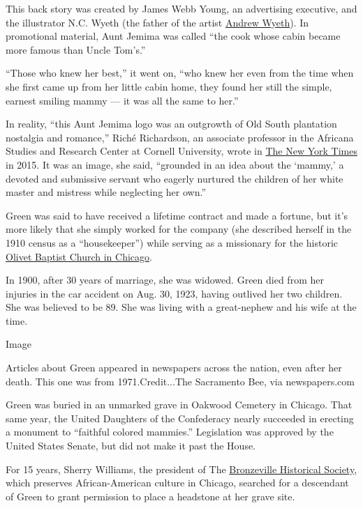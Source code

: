 This back story was created by James Webb Young, an advertising
executive, and the illustrator N.C. Wyeth (the father of the artist
\href{https://www.nytimes.com/2009/01/17/arts/design/17wyeth.html}{Andrew
Wyeth}). In promotional material, Aunt Jemima was called ``the cook
whose cabin became more famous than Uncle Tom's.''

``Those who knew her best,'' it went on, ``who knew her even from the
time when she first came up from her little cabin home, they found her
still the simple, earnest smiling mammy --- it was all the same to
her.''

In reality, ``this Aunt Jemima logo was an outgrowth of Old South
plantation nostalgia and romance,'' Riché Richardson, an associate
professor in the Africana Studies and Research Center at Cornell
University, wrote in
\href{https://www.nytimes.com/roomfordebate/2015/06/24/besides-the-confederate-flag-what-other-symbols-should-go/can-we-please-finally-get-rid-of-aunt-jemima}{The
New York Times} in 2015. It was an image, she said, ``grounded in an
idea about the `mammy,' a devoted and submissive servant who eagerly
nurtured the children of her white master and mistress while neglecting
her own.''

Green was said to have received a lifetime contract and made a fortune,
but it's more likely that she simply worked for the company (she
described herself in the 1910 census as a ``housekeeper'') while serving
as a missionary for the historic
\href{http://www.olivetbaptistchurchchicago.org/}{Olivet Baptist Church
in Chicago}.

In 1900, after 30 years of marriage, she was widowed. Green died from
her injuries in the car accident on Aug. 30, 1923, having outlived her
two children. She was believed to be 89. She was living with a
great-nephew and his wife at the time.

Image

Articles about Green appeared in newspapers across the nation, even
after her death. This one was from 1971.Credit...The Sacramento Bee, via
newspapers.com

Green was buried in an unmarked grave in Oakwood Cemetery in Chicago.
That same year, the United Daughters of the Confederacy nearly succeeded
in erecting a monument to ``faithful colored mammies.'' Legislation was
approved by the United States Senate, but did not make it past the
House.

For 15 years, Sherry Williams, the president of The
\href{https://bronzevillehistoricalsociety.wordpress.com/}{Bronzeville
Historical Society}, which preserves African-American culture in
Chicago, searched for a descendant of Green to grant permission to place
a headstone at her grave site.

